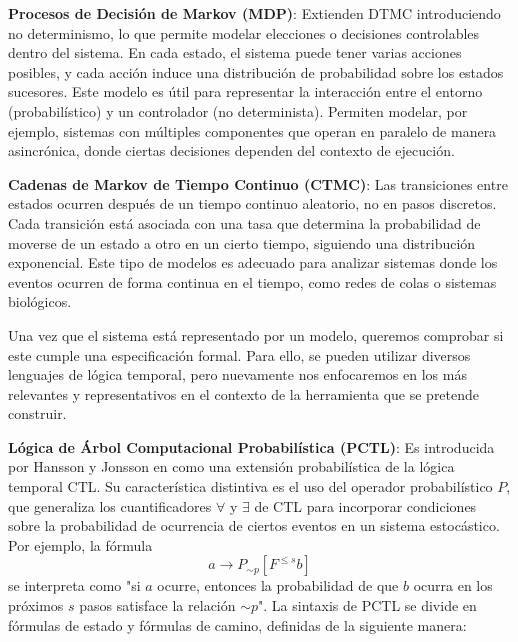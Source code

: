 \documentclass[runningheads]{llncs}
\begin{document}
\textbf{Procesos de Decisión de Markov (MDP)}: Extienden DTMC introduciendo no determinismo, lo que permite modelar elecciones o decisiones controlables dentro del sistema. En cada estado, el sistema puede tener varias acciones posibles, y cada acción induce una distribución de probabilidad sobre los estados sucesores. Este modelo es útil para representar la interacción entre el entorno (probabilístico) y un controlador (no determinista). Permiten modelar, por ejemplo, sistemas con múltiples componentes que operan en paralelo de manera asincrónica, donde ciertas decisiones dependen del contexto de ejecución.

\textbf{Cadenas de Markov de Tiempo Continuo (CTMC)}: Las transiciones entre estados ocurren después de un tiempo continuo aleatorio, no en pasos discretos. Cada transición está asociada con una tasa que determina la probabilidad de moverse de un estado a otro en un cierto tiempo, siguiendo una distribución exponencial. Este tipo de modelos es adecuado para analizar sistemas donde los eventos ocurren de forma continua en el tiempo, como redes de colas o sistemas biológicos.

Una vez que el sistema está representado por un modelo, queremos comprobar si este cumple una especificación formal. Para ello, se pueden utilizar diversos lenguajes de lógica temporal, pero nuevamente nos enfocaremos en los más relevantes y representativos en el contexto de la herramienta que se pretende construir.

\textbf{Lógica de Árbol Computacional Probabilística (PCTL)}: Es introducida por Hansson y Jonsson en \cite{HH94} como una extensión probabilística de la lógica temporal CTL. Su característica distintiva es el uso del operador probabilístico $P$, que generaliza los cuantificadores $\forall$ y $\exists$ de CTL para incorporar condiciones sobre la probabilidad de ocurrencia de ciertos eventos en un sistema estocástico. Por ejemplo, la fórmula
\[a\to P_{\sim p}[F^{\le s} b]\]
se interpreta como "si $a$ ocurre, entonces la probabilidad de que $b$ ocurra en los próximos $s$ pasos satisface la relación $\sim p$". La sintaxis de PCTL se divide en fórmulas de estado y fórmulas de camino, definidas de la siguiente manera:
\end{document}
